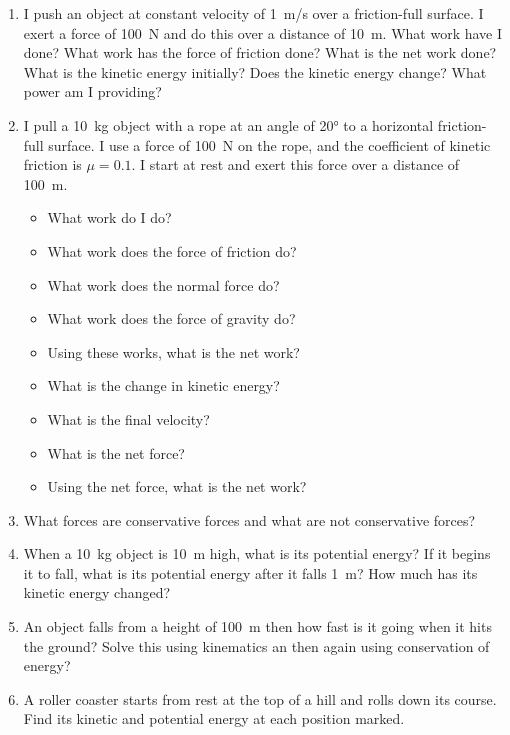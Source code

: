\begin{enumerate}
\item I push an object at constant velocity of \SI{1}{m/s} over a friction-full surface. I exert a force of \SI{100}{\newton} and do this over a distance of \SI{10}{\meter}. What work have I done? What work has the force of friction done? What is the net work done? What is the kinetic energy initially? Does the kinetic energy change? What power am I providing?
\bigskip

\item 
I pull a \SI{10}{kg} object with a rope at an angle of \ang{20} to a horizontal friction-full surface. I use a force of \SI{100}{\newton} on the rope, and the coefficient of kinetic friction is $\mu=0.1$. I start at rest and exert this force over a distance of \SI{100}{\meter}. 
\begin{itemize}
	\setlength\itemsep{1 in}
	\item What work do I do?
	\item What work does the force of friction do?
	\item What work does the normal force do?
	\item What work does the force of gravity do?
	\item Using these works, what is the net work?
	\item What is the change in kinetic energy?
	\item What is the final velocity?
	\item What is the net force?
	\item Using the net force, what is the net work?
\end{itemize}

\item What forces are conservative forces and what are not conservative forces?

\item 
When a \SI{10}{kg} object is \SI{10}{\meter} high, what is its potential energy? If it begins it to fall, what is its potential energy after it falls \SI{1}{\meter}? How much has its kinetic energy changed?

\item 
An object falls from a height of \SI{100}{\meter} then how fast is it going when it hits the ground? Solve this using kinematics an then again using conservation of energy? \bigskip

\item 
A roller coaster starts from rest at the top of a hill and rolls down its course. Find its kinetic and potential energy at each position marked.


\end{enumerate}
